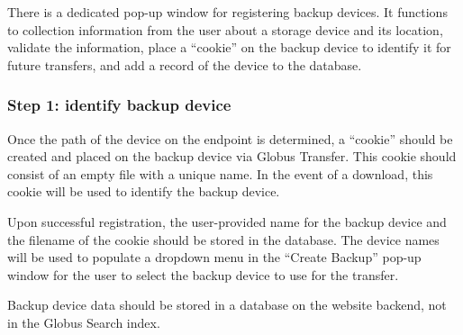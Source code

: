 
There is a dedicated pop-up window for registering backup devices. It functions
to collection information from the user about a storage device and its location,
validate the information, place a ``cookie'' on the backup device to identify it 
for future transfers, and add a record of the device to the database.

\subsubsection{Step 1: identify backup device}

Once the path of the device on the endpoint is determined, a ``cookie'' 
should be created and placed on the backup device via Globus Transfer. This cookie 
should consist of an empty file with a unique name. In the event of a download, this 
cookie will be used to identify the backup device.

Upon successful registration, the user-provided name for the backup device and the 
filename of the cookie should be stored in the database. The device names will be 
used to populate a dropdown menu in the ``Create Backup'' pop-up window for the
user to select the backup device to use for the transfer.

Backup device data should be stored in a database on the website backend, not in
the Globus Search index.

